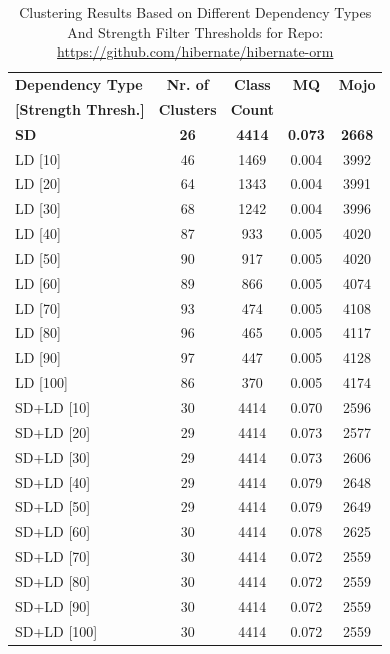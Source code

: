 \documentclass{ieeeaccess}
\begin{document}
\begin{table}[h]
\caption{Clustering Results Based on Different Dependency Types And Strength Filter Thresholds for Repo: \href{https://github.com/hibernate/hibernate-orm}{https://github.com/hibernate/hibernate-orm}}
\label{tab:clustering_results_hibernate}
\centering
\setlength{\tabcolsep}{10pt}
\begin{tabular}{|l|c|c|c|c|}
\hline
\textbf{Dependency Type} & \textbf{Nr. of} & \textbf{Class} & \textbf{MQ} & \textbf{Mojo} \\
\textbf{[Strength Thresh.]} & \textbf{Clusters} & \textbf{Count} &  &  \\
\hline
\textbf{SD} & \textbf{26} & \textbf{4414} & \textbf{0.073} & \textbf{2668} \\
LD [10] & 46 & 1469 & 0.004 & 3992 \\
LD [20] & 64 & 1343 & 0.004 & 3991 \\
LD [30] & 68 & 1242 & 0.004 & 3996 \\
LD [40] & 87 & 933 & 0.005 & 4020 \\
LD [50] & 90 & 917 & 0.005 & 4020 \\
LD [60] & 89 & 866 & 0.005 & 4074 \\
LD [70] & 93 & 474 & 0.005 & 4108 \\
LD [80] & 96 & 465 & 0.005 & 4117 \\
LD [90] & 97 & 447 & 0.005 & 4128 \\
LD [100] & 86 & 370 & 0.005 & 4174 \\
\hline
SD+LD [10] & 30 & 4414 & 0.070 & 2596 \\
SD+LD [20] & 29 & 4414 & 0.073 & 2577 \\
SD+LD [30] & 29 & 4414 & 0.073 & 2606 \\
SD+LD [40] & 29 & 4414 & 0.079 & 2648 \\
SD+LD [50] & 29 & 4414 & 0.079 & 2649 \\
SD+LD [60] & 30 & 4414 & 0.078 & 2625 \\
SD+LD [70] & 30 & 4414 & 0.072 & 2559 \\
SD+LD [80] & 30 & 4414 & 0.072 & 2559 \\
SD+LD [90] & 30 & 4414 & 0.072 & 2559 \\
SD+LD [100] & 30 & 4414 & 0.072 & 2559 \\
\hline
\end{tabular}
\end{table}
\end{document}
